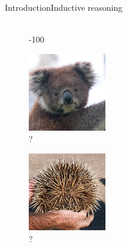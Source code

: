 \begin{frame}{Introduction}{Inductive reasoning}
\begin{figure}[ht]
\begin{minipage}[b]{0.2\linewidth}
\\{\color{red}-100}
\end{minipage}
\hfill
\begin{minipage}[b]{0.2\linewidth}
\centering
\includegraphics[width=\textwidth]{img/introduction/koala.png}
\\?
\end{minipage}
\hfill
\begin{minipage}[b]{0.2\linewidth}
\centering
\includegraphics[width=\textwidth]{img/introduction/echidna.png}
\\?
\end{minipage}

\end{figure}
\end{frame}

